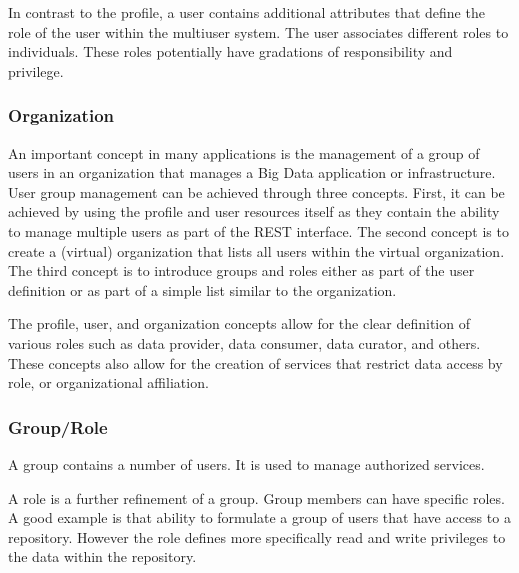 \documentclass[10pt]{article}
\begin{document}
In contrast to the profile, a user contains additional attributes that
define the role of the user within the multiuser system. The user
associates different roles to individuals. These roles potentially
have gradations of responsibility and privilege.


\subsubsection{Organization}

An important concept in many applications is the management of a group
of users in an organization that manages a Big Data application or
infrastructure. User group management can be achieved through three concepts. First, it
can be achieved by using the profile and user resources itself as
they contain the ability to manage multiple users as part of the REST
interface. The second concept is to create a (virtual) organization that
lists all users within the virtual organization. The third concept is to
introduce groups and roles either as part of the user definition or as
part of a simple list similar to the organization.


The  profile, user, and organization concepts allow for the clear definition of 
various roles such as
data provider, data consumer, data curator, and others. These concepts also
allow for the creation of services that restrict data access by role, or
organizational affiliation.


\subsubsection{Group/Role}

A group contains a number of users. It is used to manage authorized
services.


A role is a further refinement of a group. Group members can have
specific roles. A good example is that ability to formulate a group of
users that have access to a repository. However the role defines more
specifically read and write privileges to the data within the repository.


\end{document}
